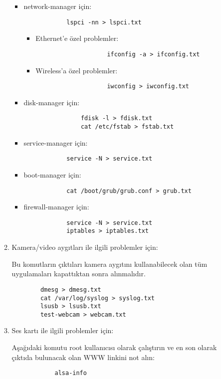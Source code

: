 \documentclass[a4paper,10pt]{article}
\begin{document}
\begin{itemize}
\begin{enumerate}
	\begin{itemize}
		\item  network-manager için:
			\begin{verbatim}
			lspci -nn > lspci.txt
			\end{verbatim}
			\begin{itemize}
  			\item Ethernet'e özel problemler:
				\begin{verbatim}
    				ifconfig -a > ifconfig.txt
				\end{verbatim}
  			\item Wireless'a özel problemler:
				\begin{verbatim}
    				iwconfig > iwconfig.txt
				\end{verbatim}
			\end{itemize}
		\item disk-manager için:
			\begin{verbatim}
		    	fdisk -l > fdisk.txt
    			cat /etc/fstab > fstab.txt
			\end{verbatim}
		\item service-manager için:
			\begin{verbatim}
			service -N > service.txt
			\end{verbatim}
		\item boot-manager için:
			\begin{verbatim}
			cat /boot/grub/grub.conf > grub.txt
			\end{verbatim}
		\item firewall-manager için:
			\begin{verbatim}
			service -N > service.txt
			iptables > iptables.txt
			\end{verbatim}
	\end{itemize}
	\item Kamera/video aygıtları ile ilgili problemler için:
		
		Bu komutların çıktıları kamera aygıtını kullanabilecek olan tüm uygulamaları kapattıktan sonra alınmalıdır.
		\begin{verbatim}
		dmesg > dmesg.txt
		cat /var/log/syslog > syslog.txt
		lsusb > lsusb.txt
		test-webcam > webcam.txt
		\end{verbatim}
	\item Ses kartı ile ilgili problemler için:

		Aşağıdaki komutu root kullanıcısı olarak çalıştırın ve en son olarak çıktıda bulunacak olan WWW linkini not alın:
		\begin{verbatim}
        	alsa-info
		\end{verbatim}
	\end{enumerate}
\end{itemize}
\end{document}
